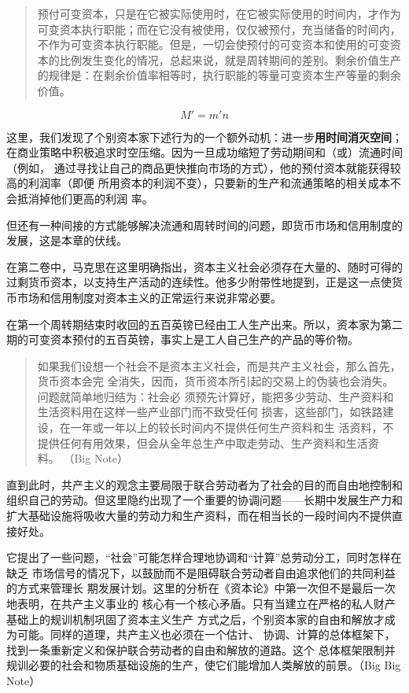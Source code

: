 \begin{quotation}
预付可变资本，只是在它被实际使用时，在它被实际使用的时间内，才作为可变资本执行职能；而在它没有被使用，仅仅被预付，充当储备的时间内，不作为可变资本执行职能。但是，一切会使预付的可变资本和使用的可变资本的比例发生变化的情况，总起来说，就是周转期间的差别。剩余价值生产的规律是：在剩余价值率相等时，执行职能的等量可变资本生产等量的剩余价值。 

\end{quotation}
 $$ M' = m'n $$

 这里，我们发现了个别资本家下述行为的一个额外动机：进一步\textbf{用时间消灭空间}；
 在商业策略中积极追求时空压缩。因为一旦成功缩短了劳动期间和（或）流通时间（例如，
 通过寻找让自己的商品更快推向市场的方式），他的预付资本就能获得较高的利润率（即便
 所用资本的利润不变），只要新的生产和流通策略的相关成本不会抵消掉他们更高的利润
 率。

 但还有一种间接的方式能够解决流通和周转时间的问题，即货币市场和信用制度的发展，这是本章的伏线。

在第二卷中，马克思在这里明确指出，资本主义社会必须存在大量的、随时可得的过剩货币资本，以支持生产活动的连续性。他多少附带性地提到，正是这一点使货币市场和信用制度对资本主义的正常运行来说非常必要。

在第一个周转期结束时收回的五百英镑已经由工人生产出来。所以，资本家为第二期的可变资本预付的五百英镑，事实上是工人自己生产的产品的等价物。

\begin{quotation}

  如果我们设想一个社会不是资本主义社会，而是共产主义社会，那么首先，货币资本会完
  全消失，因而，货币资本所引起的交易上的伪装也会消失。问题就简单地归结为：社会必
  须预先计算好，能把多少劳动、生产资料和生活资料用在这样一些产业部门而不致受任何
  损害，这些部门，如铁路建设，在一年或一年以上的较长时间内不提供任何生产资料和生
  活资料，不提供任何有用效果，但会从全年总生产中取走劳动、生产资料和生活资
  料。 （Big Note）
\end{quotation}

直到此时，共产主义的观念主要局限于联合劳动者为了社会的目的而自由地控制和组织自己的劳动。但这里隐约出现了一个重要的协调问题——长期中发展生产力和扩大基础设施将吸收大量的劳动力和生产资料，而在相当长的一段时间内不提供直接好处。


它提出了一些问题，“社会”可能怎样合理地协调和“计算”总劳动分工，同时怎样在缺乏
市场信号的情况下，以鼓励而不是阻碍联合劳动者自由追求他们的共同利益的方式来管理长
期发展计划。这里的分析在《资本论》中第一次但不是最后一次地表明，在共产主义事业的
核心有一个核心矛盾。只有当建立在严格的私人财产基础上的规训机制巩固了资本主义生产
方式之后，个别资本家的自由和解放才成为可能。同样的道理，共产主义也必须在一个估计、
协调、计算的总体框架下，找到一条重新定义和保护联合劳动者的自由和解放的道路。这个
总体框架限制并规训必要的社会和物质基础设施的生产，使它们能增加人类解放的前景。（Big Big Note）


